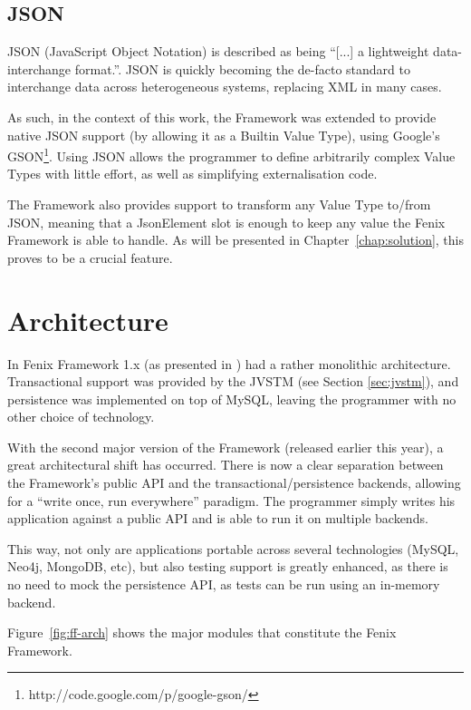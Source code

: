 \subsection{JSON}
\label{sec:json}

JSON (JavaScript Object Notation) is described as being ``[...] a
lightweight data-interchange format.''. JSON is quickly becoming the
de-facto standard to interchange data across heterogeneous systems,
replacing XML in many cases.

As such, in the context of this work, the Framework was extended to
provide native JSON support (by allowing it as a Builtin Value Type),
using Google's GSON\footnote{http://code.google.com/p/google-gson/}.
Using JSON allows the programmer to define arbitrarily complex Value
Types with little effort, as well as simplifying externalisation code.

The Framework also provides support to transform any Value Type
to/from JSON, meaning that a JsonElement slot is enough to keep any
value the Fenix Framework is able to handle. As will be presented in
Chapter~\ref{chap:solution}, this proves to be a crucial feature.

\section{Architecture}
\label{sec:ff-arch}

In Fenix Framework 1.x (as presented in \cite{fernandes2011strict})
had a rather monolithic architecture. Transactional support was
provided by the JVSTM (see Section \ref{sec:jvstm}), and persistence
was implemented on top of MySQL, leaving the programmer with no other
choice of technology.

With the second major version of the Framework (released earlier this
year), a great architectural shift has occurred. There is now a clear
separation between the Framework's public API and the
transactional/persistence backends, allowing for a ``write once, run
everywhere'' paradigm. The programmer simply writes his application
against a public API and is able to run it on multiple backends.

This way, not only are applications portable across several
technologies (MySQL, Neo4j, MongoDB, etc), but also testing support is
greatly enhanced, as there is no need to mock the persistence API, as
tests can be run using an in-memory backend.

Figure~\ref{fig:ff-arch} shows the major modules that constitute the Fenix
Framework.

